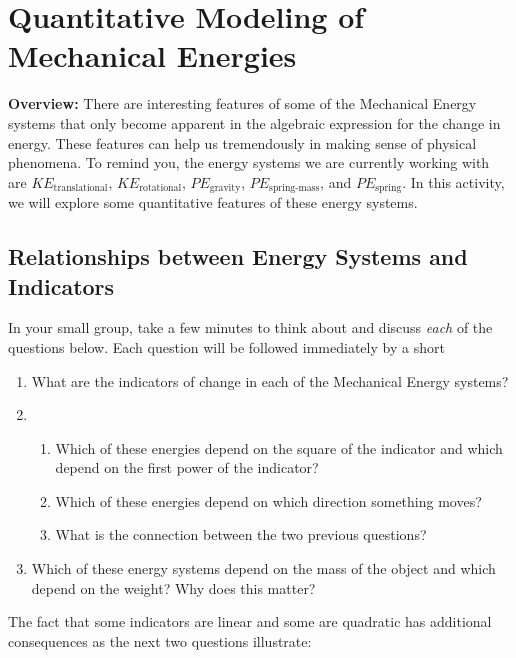 \section{Quantitative Modeling of Mechanical Energies}
\label{act2.2.1}

\begin{overview}

	\textbf{Overview:} There are interesting features of some of the Mechanical Energy systems that only become apparent in the algebraic expression for the change in energy. These features can help us tremendously in making sense of physical phenomena. To remind you, the energy systems we are currently working with are $KE_\text{translational}$, $KE_\text{rotational}$, $PE_\text{gravity}$, $PE_\text{spring-mass}$, and $PE_\text{spring}$. In this activity, we will explore some quantitative features of these energy systems.
	
\end{overview}


\subsection{Relationships between Energy Systems and Indicators}

 In your small group, take a few minutes to think about and discuss {\em each} of the questions below. Each question will be followed immediately by a short \WCD

\begin{enumerate}
	\item What are the indicators of change in each of the Mechanical Energy systems?
	\item \begin{enumerate}
		\item Which of these energies depend on the square of the indicator and which depend on the first power of the indicator?
		\item Which of these energies depend on which direction something moves?
		\item What is the connection between the two previous questions?
	\end{enumerate}
	\item Which of these energy systems depend on the mass of the object and which depend on the weight? Why does this matter?
\end{enumerate}

\noindent
The fact that some indicators are linear and some are quadratic has additional consequences as the next two questions illustrate:

